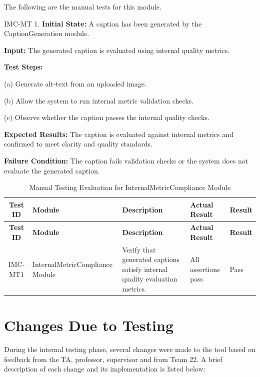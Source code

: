 \documentclass[12pt, titlepage]{article}
\begin{document}
The following are the manual tests for this module.

IMC-MT 1. \textbf{Initial State:} A caption has been generated by the
CaptionGeneration module.

\textbf{Input:} The generated caption is evaluated using internal
quality metrics.

\textbf{Test Steps:}

(a) Generate alt-text from an uploaded image.

(b) Allow the system to run internal metric validation checks.

(c) Observe whether the caption passes the internal quality checks.

\textbf{Expected Results:} The caption is evaluated against internal
metrics and confirmed to meet clarity and quality standards.

\textbf{Failure Condition:} The caption fails validation checks or
the system does not evaluate the generated caption.

\begin{longtable}{@{}c
    >{\raggedright\arraybackslash}p{4.0cm}
    >{\raggedright\arraybackslash}p{4.5cm}
    >{\raggedright\arraybackslash}p{3.6cm}
  >{\centering\arraybackslash}p{1.2cm}@{}}

  \caption{Manual Testing Evaluation for InternalMetricCompliance
  Module}\label{table:metric-manual}\\
  \toprule
  \textbf{Test ID} & \textbf{Module} & \textbf{Description} &
  \textbf{Actual Result} & \textbf{Result} \\
  \midrule
  \endfirsthead

  \toprule
  \textbf{Test ID} & \textbf{Module} & \textbf{Description} &
  \textbf{Actual Result} & \textbf{Result} \\
  \midrule
  \endhead

  \bottomrule
  \endlastfoot

  IMC-MT1 & InternalMetricCompliance Module &
  Verify that generated captions satisfy internal quality evaluation metrics. &
  All assertions pass &
  \cellcolor{green}Pass \\

\end{longtable}
\section{Changes Due to Testing}
During the internal testing phase, several changes were made to the
tool based on feedback from the TA, professor, supervisor and from Team 22.
A brief description of each change and its implementation is listed below:
\end{document}
